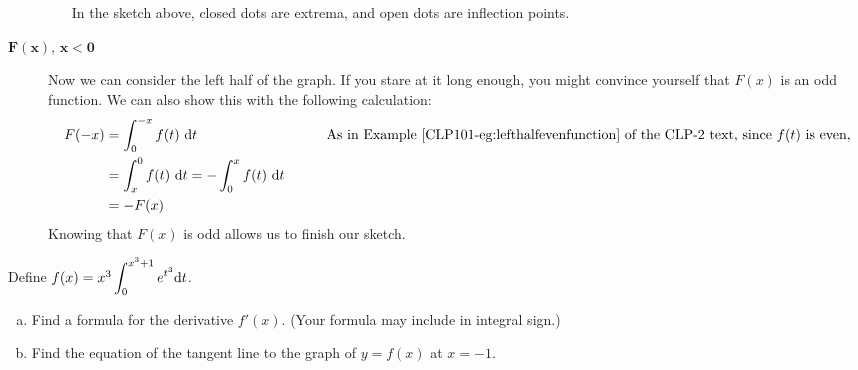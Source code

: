 \begin{solution}
\begin{description}
\begin{itemize}
In the sketch above, closed dots are extrema, and open dots are inflection points.
\end{itemize}
\item[$\mathbf{F(x),\,x < 0}$]
Now we can consider the left half of the graph. If you stare at it long enough, you might convince yourself that $F(x)$ is an odd function. We can also show this with the following calculation:
\begin{alignat*}{3}
F(-x)&=\int_0^{-x} f(t)\ \dee{t} &&\qquad\mbox{As in Example~\eref{CLP101}{eg:lefthalfevenfunction} of the CLP-2 text, since $f(t)$ is even,}\\
&=\int_x^0 f(t)\ \dee{t}=-\int_0^x f(t)\ \dee{t}\\
&=-F(x)
\end{alignat*}
Knowing that $F(x)$ is odd allows us to finish our sketch.


\begin{center}
\end{center}

\end{description}
\end{solution}

\begin{question}[2015A]
Define $f(x)=x^3\displaystyle\int_{0}^{x^3+1} e^{t^3} \mathrm{d}t$.
\begin{enumerate}[(a)]
\item
Find a formula for the derivative $f'(x)$. (Your formula may include in integral sign.)
\item
Find the equation of the tangent line to the graph of $y=f(x)$ at $x=-1$.
\end{enumerate}
\end{question}

